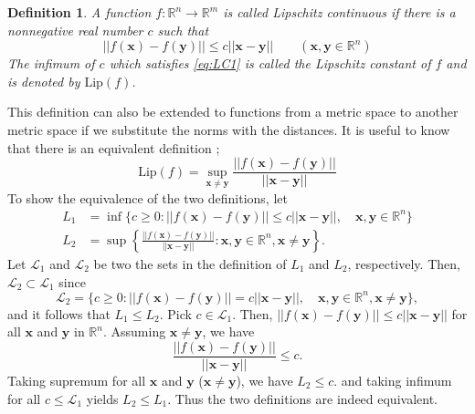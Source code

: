 \documentclass[11pt]{report}
\newtheorem{definition}{Definition} %
\newcommand\bx{\ensuremath{\boldsymbol x}}
\newcommand\by{\ensuremath{\boldsymbol y}}
\newcommand\lip{\ensuremath{\text{Lip}}}
\begin{document}
\begin{definition}\label{LC}
A function \(f:\mathbb R^n\to\mathbb R^m\) is called \emph{Lipschitz continuous} if there is a nonnegative real number \(c\) such that
\begin{equation}\label{eq:LC1}
||f(\bx)-f(\by)||\le c||\bx-\by||\qquad(\bx,\by\in\mathbb R^n)
\end{equation}
The infimum of \(c\) which satisfies \eqref{eq:LC1} is called the \emph{Lipschitz constant} of \(f\) and is denoted by \(\lip(f)\).
\end{definition}

This definition can also be extended to functions from a metric space to another metric space if we substitute the norms with the distances.
It is useful to know that there is an equivalent definition ;
\begin{equation}\label{eq:LC2}
\lip(f)=\sup_{\bx\neq\by}\frac{||f(\bx)-f(\by)||}{||\bx-\by||}
\end{equation}
To show the equivalence of the two definitions, let
\begin{equation}\label{eq:equivalent_def}
\begin{aligned}
L_1&=\inf\{c\ge0:||f(\bx)-f(\by)||\le c||\bx-\by||,\quad\bx,\by\in\mathbb R^n\}\\
L_2&=\sup\left\{\frac{||f(\bx)-f(\by)||}{||\bx-\by||}:\bx,\by\in\mathbb R^n,\bx\neq\by\right\}.
\end{aligned}
\end{equation}
Let \(\mathcal L_1\) and \(\mathcal L_2\) be two the sets in the definition of \(L_1\) and \(L_2\), respectively.
Then, \(\mathcal L_2\subset\mathcal L_1\) since
\[\mathcal L_2=\{c\ge0:||f(\bx)-f(\by)||=c||\bx-\by||,\quad\bx,\by\in\mathbb R^n,\bx\neq\by\},\]
and it follows that \(L_1\le L_2\).
Pick \(c\in\mathcal L_1\).
Then, \(||f(\bx)-f(\by)||\le c||\bx-\by||\) for all \(\bx\) and \(\by\) in \(\mathbb R^n\).
Assuming \(\bx\neq \by\), we have
\[
\frac{||f(\bx)-f(\by)||}{||\bx-\by||}\le c.
\]
Taking supremum for all \bx{} and \by{} (\(\bx\neq\by\)), we have \(L_2\le c.\) and taking infimum for all \(c\le\mathcal L_1\) yields \(L_2\le L_1\).
Thus the two definitions are indeed equivalent.
\end{document}
